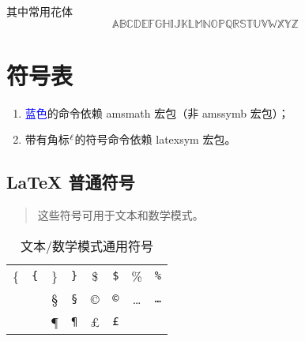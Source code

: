 \documentclass{article}
\makeatletter
\def\lsym{$\mathsurround=0pt {}^\ell$}
\def\SC      #1{#1       & \texttt{\string#1}}
\newenvironment{symbols}[1]%
  {\small\def\arraystretch{1.5
  }
  \begin{tabular}{@{}#1@{}}}%
  {\end{tabular}}
\makeatother
\begin{document}
其中常用花体
\begin{equation}
\mathbb{ABCDEFGHIJKLMNOPQRSTUVWXYZ}
\end{equation}

  

\clearpage
\section{符号表}\label{sec:math-tables}
  \begin{enumerate}
    \item \textcolor{blue}{蓝色}的命令依赖 {amsmath} 宏包（非 {amssymb} 宏包）；
    \item 带有角标\lsym 的符号命令依赖 {latexsym} 宏包。
  \end{enumerate}

\subsection{\LaTeX{} 普通符号}
\begin{table}[htp]
\centering
\caption{文本/数学模式通用符号}\label{tbl:general-syms}
\begin{quote}\footnotesize%
这些符号可用于文本和数学模式。
\end{quote}
\begin{symbols}{*4{cl}}
\hline
 \SC{\{}    &  \SC{\}}  &  \SC{\$}         &  \SC{\%}               \\
 \SC{\dag}  &  \SC{\S}  &  \SC{\copyright} &  \SC{\dots}            \\
 \SC{\ddag} &  \SC{\P}  &  \SC{\pounds}    &                        \\
\hline
\end{symbols}
\end{table}
\end{document}
